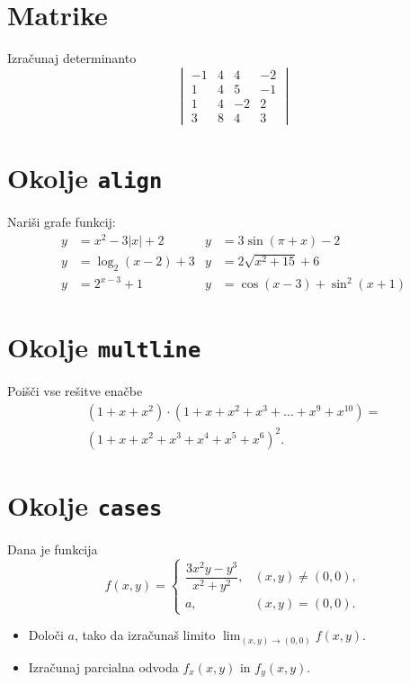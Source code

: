 \documentclass[a4paper,12pt]{article}
\begin{document}
\section*{Matrike}
Izračunaj determinanto
 \[
\begin{vmatrix}
-1 & 4 & 4 & -2 \\
1 & 4 & 5 & -1 \\
1 & 4 & -2 & 2 \\
3 & 8 & 4 & 3
\end{vmatrix}
\]

\section*{Okolje \texttt{align}}
Nariši grafe funkcij:
\begin{align*}
y &= x^2 - 3|x| + 2
& y &= 3\sin(\pi+x) - 2 \\
y &= \log_2(x-2) + 3
& y &= 2\sqrt{x^2+15} + 6 \\
y &= 2^{x-3} + 1
& y &= \cos(x-3) + \sin^2(x+1)
\end{align*}

\section*{Okolje \texttt{multline}}
Poišči vse rešitve enačbe
\begin{multline*}
(1+x+x^2)\cdot(1+x+x^2+x^3+\ldots+x^9+x^{10}) = \\
(1+x+x^2+x^3+x^4+x^5+x^6)^2.
\end{multline*}

\section*{Okolje \texttt{cases}}
Dana je funkcija
\[
f(x,y)=
\begin{cases}
\dfrac{3x^2y-y^3}{x^2+y^2}, & (x,y)\neq(0,0),\\
a, & (x,y)=(0,0).
\end{cases}
\]
\begin{itemize}
\item Določi \(a\), tako da izračunaš limito \( \lim_{(x,y)\to(0,0)} f(x,y) \).
\item Izračunaj parcialna odvoda \(f_x(x,y)\) in \(f_y(x,y)\).
\end{itemize}
\end{document}
